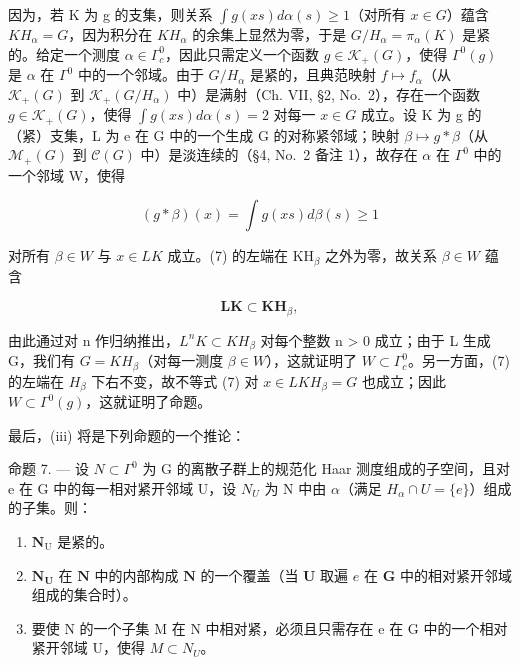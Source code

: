 因为，若 K 为 g 的支集，则关系 \(\int g(xs) d\alpha(s) \geqslant 1\)（对所有 \(x \in G\)）蕴含 \(KH_{\alpha} = G\)，因为积分在 \(KH_{\alpha}\) 的余集上显然为零，于是 \(G/H_{\alpha} = \pi_{\alpha}(K)\) 是紧的。给定一个测度 \(\alpha \in \Gamma_{c}^{0}\)，因此只需定义一个函数 \(g \in \mathcal{K}_{+}(G)\)，使得 \(\Gamma^{0}(g)\) 是 \(\alpha\) 在 \(\Gamma^{0}\) 中的一个邻域。由于 \(G/H_{\alpha}\) 是紧的，且典范映射 \(f \mapsto f_{\alpha}\)（从 \(\mathcal{K}_{+}(G)\) 到 \(\mathcal{K}_{+}(G/H_{\alpha})\) 中）是满射（Ch. VII, §2, No.~2），存在一个函数 \(g \in \mathcal{K}_{+}(G)\)，使得 \(\int g(xs) d\alpha(s) = 2\) 对每一 \(x \in G\) 成立。设 K 为 g 的（紧）支集，L 为 e 在 G 中的一个生成 G 的对称紧邻域；映射 \(\beta \mapsto g*\beta\)（从 \(\mathcal{M}_{+}(G)\) 到 \(\mathcal{C}(G)\) 中）是淡连续的（§4, No.~2 备注 1），故存在 \(\alpha\) 在 \(\Gamma^{0}\) 中的一个邻域 W，使得

\[
(g * \beta) (x) = \int g (x s) d \beta (s) \geqslant 1\tag{7}
\]

对所有 \(\beta \in W\) 与 \(x \in LK\) 成立。(7) 的左端在 \(\mathrm{KH}_{\beta}\) 之外为零，故关系 \(\beta \in W\) 蕴含

\[
\mathbf {L K} \subset \mathbf {K H} _ {\beta},
\]

由此通过对 n 作归纳推出，\(L^{n}K \subset KH_{\beta}\) 对每个整数 n \textgreater{} 0 成立；由于 L 生成 G，我们有 \(G = KH_{\beta}\)（对每一测度 \(\beta \in W\)），这就证明了 \(W \subset \Gamma_{c}^{0}\)。另一方面，(7) 的左端在 \(H_{\beta}\) 下右不变，故不等式 (7) 对 \(x \in LKH_{\beta} = G\) 也成立；因此 \(W \subset \Gamma^{0}(g)\)，这就证明了命题。

最后，(iii) 将是下列命题的一个推论：

命题 7. --- 设 \(N \subset \Gamma^{0}\) 为 G 的离散子群上的规范化 Haar 测度组成的子空间，且对 e 在 G 中的每一相对紧开邻域 U，设 \(N_{U}\) 为 N 中由 \(\alpha\)（满足 \(H_{\alpha} \cap U = \{e\}\)）组成的子集。则：

\begin{enumerate}
\def\labelenumi{\alph{enumi})}
\item
  \(\mathbf{N}_{\mathrm{U}}\) 是紧的。
\item
  \(\mathbf{N}_{\mathbf{U}}\) 在 \(\mathbf{N}\) 中的内部构成 \(\mathbf{N}\) 的一个覆盖（当 \(\mathbf{U}\) 取遍 \(e\) 在 \(\mathbf{G}\) 中的相对紧开邻域组成的集合时）。
\item
  要使 N 的一个子集 M 在 N 中相对紧，必须且只需存在 e 在 G 中的一个相对紧开邻域 U，使得 \(M \subset N_{U}\)。
\end{enumerate}

